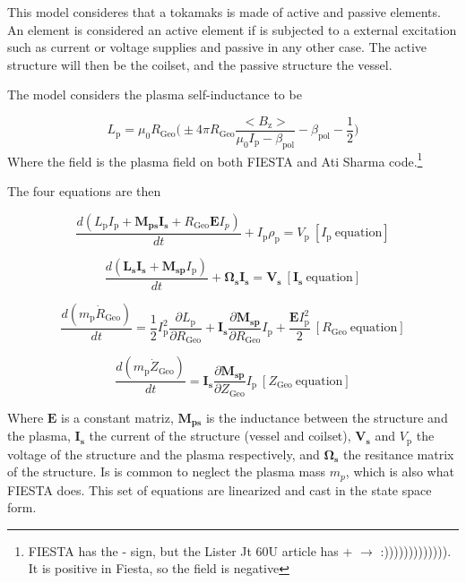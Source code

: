 \documentclass[a4paper,12pt,oneside]{book}
\newcommand{\p}{\partial}
\begin{document}
This model consideres that a tokamaks is made of active and passive elements. An element is considered an active element if is subjected to a external excitation such as current or voltage supplies and passive in any other case. The active structure will then be the coilset, and the passive structure the vessel. 



The model considers the plasma self-inductance to be

\begin{equation}
L_\text{p}=\mu_0 R_\text{Geo} \Big( \pm 4 \pi R_\text{Geo} \dfrac{<B_\text{z}>}{\mu_0 I_\text{p}-\beta_\text{pol}}-\beta_\text{pol} -\dfrac{1}{2} \Big)
\end{equation}
Where the field is the plasma field on both FIESTA and Ati Sharma code.\footnote{FIESTA has the - sign, but the Lister Jt 60U article has + $\rightarrow$ :))))))))))))). It is positive in Fiesta, so the field is negative}

The four equations are then \cite{AtiSharmaTesis}


\begin{equation}\label{ec RZIP 1}
\dfrac{d(L_\text{p} I_\text{p} + \boldsymbol{M_{ps}I_\text{s}}+ R_\text{Geo}\boldsymbol{E} I_p)}{dt}+I_\text{p} \rho_\text{p}=V_\text{p} \ [I_\text{p} \ \text{equation}]
\end{equation}

\begin{equation}\label{ec RZIP 2}
\dfrac{d(\boldsymbol{L_\text{s} I_\text{s}+M_\text{sp}}I_\text{p})}{dt}+ \boldsymbol{ \Omega_\text{s} I_\text{s}}=\boldsymbol{V_\text{s}} \ [\boldsymbol{I_\text{s}} \  \text{equation}]
\end{equation}

\begin{equation}\label{ec RZIP 3}
\dfrac{d(m_\text{p} \dot{R}_\text{Geo})}{dt}=\dfrac{1}{2}I_\text{p}^2 \dfrac{\p L_\text{p}}{\p R_\text{Geo}}+ \boldsymbol{I_\text{s}} \dfrac{\p \boldsymbol{M_\text{sp}}}{\p R_\text{Geo}}I_\text{p}+ \dfrac{\boldsymbol{E} I_\text{p}^2}{2} \ [R_\text{Geo} \  \text{equation}]
\end{equation}

\begin{equation}\label{ec RZIP 4}
\dfrac{d(m_\text{p} \dot{Z}_\text{Geo})}{dt}=\boldsymbol{I_\text{s}} \dfrac{\p \boldsymbol{M_\text{sp}}}{\p Z_\text{Geo}}I_\text{p} \ [Z_\text{Geo} \ \text{equation}]
\end{equation}


Where $ \boldsymbol{E}$ is a constant matriz, $\boldsymbol{M_\text{ps}}$ is the inductance between the structure and the plasma, $\boldsymbol{I_\text{s}}$ the current of the structure (vessel and coilset), $\boldsymbol{V_\text{s}}$ and $V_\text{p}$ the voltage of the structure and the plasma respectively, and $\boldsymbol{\Omega_\text{s}}$ the resitance matrix of the structure. Is is common to neglect the plasma mass $m_p$, which is also what FIESTA does. This set of equations are linearized and cast in the state space form.
\end{document}
